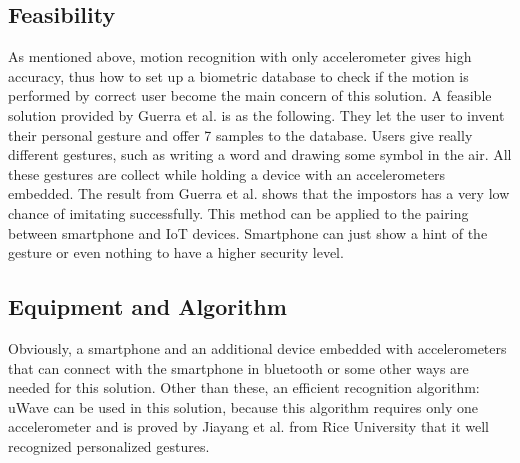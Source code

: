 \subsection{Feasibility}

As mentioned above, motion recognition with only accelerometer gives high accuracy, thus how to set up a biometric database to check if the motion is performed by correct user become the main concern of this solution. A feasible solution provided by Guerra et al. \cite{Casanova} is as the following. They let the user to invent their personal gesture and offer 7 samples to the database. Users give really different gestures, such as writing a word and drawing some symbol in the air. All these gestures are collect while holding a device with an accelerometers embedded. The result from Guerra et al. \cite{Casanova} shows that the impostors has a very low chance of imitating successfully. This method can be applied to the pairing between smartphone and \gls{IoT} devices. Smartphone can just show a hint of the gesture or even nothing to have a higher security level.

\subsection{Equipment and Algorithm}
Obviously, a smartphone and an additional device embedded with accelerometers that can connect with the smartphone in bluetooth or some other ways are needed for this solution. Other than these, an efficient recognition algorithm: uWave can be used in this solution, because this algorithm requires only one accelerometer and is proved by Jiayang et al. \cite{Liu:2009, LiuuWave} from Rice University that it well recognized personalized gestures.